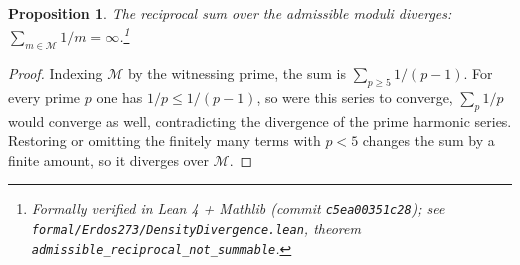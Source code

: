\documentclass[11pt,a4paper]{article}
\theoremstyle{plain}
\newtheorem{proposition}[theorem]{Proposition}
\theoremstyle{definition}
\theoremstyle{remark}
\begin{document}
\begin{proposition}\label{prop:density-diverges}
The reciprocal sum over the admissible moduli diverges:
$\sum_{m \in \mathcal{M}} 1/m = \infty$.\footnote{Formally verified
in Lean 4 + Mathlib (commit \texttt{c5ea00351c28}); see
\texttt{formal/Erdos273/DensityDivergence.lean}, theorem
\texttt{admissible\_reciprocal\_not\_summable}.}
\end{proposition}
\begin{proof}
Indexing $\mathcal{M}$ by the witnessing prime, the sum is
$\sum_{p \geq 5} 1/(p - 1)$. For every prime $p$ one has
$1/p \leq 1/(p - 1)$, so were this series to converge, $\sum_p 1/p$
would converge as well, contradicting the divergence of the prime
harmonic series. Restoring or omitting the finitely many terms with
$p < 5$ changes the sum by a finite amount, so it diverges over
$\mathcal{M}$.
\end{proof}
\end{document}
